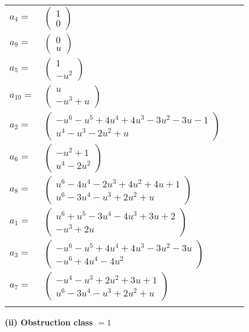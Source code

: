 \documentclass[1p]{elsarticle_modified}
\theoremstyle{definition}
\begin{document}
\begin{tabular}{m{7pt} m{180pt} m{7pt} m{180pt} }
\flushright $a_{4}=$&$\begin{pmatrix}1\\0\end{pmatrix}$ \\
\flushright $a_{9}=$&$\begin{pmatrix}0\\u\end{pmatrix}$ \\
\flushright $a_{5}=$&$\begin{pmatrix}1\\- u^2\end{pmatrix}$ \\
\flushright $a_{10}=$&$\begin{pmatrix}u\\- u^3+u\end{pmatrix}$ \\
\flushright $a_{2}=$&$\begin{pmatrix}- u^6- u^5+4 u^4+4 u^3-3 u^2-3 u-1\\u^4- u^3-2 u^2+u\end{pmatrix}$ \\
\flushright $a_{6}=$&$\begin{pmatrix}- u^2+1\\u^4-2 u^2\end{pmatrix}$ \\
\flushright $a_{8}=$&$\begin{pmatrix}u^6-4 u^4-2 u^3+4 u^2+4 u+1\\u^6-3 u^4- u^3+2 u^2+u\end{pmatrix}$ \\
\flushright $a_{1}=$&$\begin{pmatrix}u^6+u^5-3 u^4-4 u^3+3 u+2\\- u^3+2 u\end{pmatrix}$ \\
\flushright $a_{3}=$&$\begin{pmatrix}- u^6- u^5+4 u^4+4 u^3-3 u^2-3 u\\- u^6+4 u^4-4 u^2\end{pmatrix}$ \\
\flushright $a_{7}=$&$\begin{pmatrix}- u^4- u^3+2 u^2+3 u+1\\u^6-3 u^4- u^3+2 u^2+u\end{pmatrix}$\\&\end{tabular}
\flushleft \textbf{(ii) Obstruction class $= 1$}\\~\\
\end{document}
